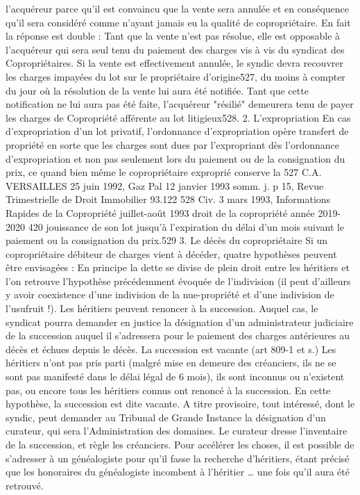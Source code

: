 l'acquéreur parce qu'il est convaincu que la vente sera annulée et en conséquence qu'il sera considéré comme n'ayant jamais eu la qualité de copropriétaire.
En fait la réponse est double :
Tant que la vente n'est pas résolue, elle est opposable à l'acquéreur qui sera seul tenu du paiement des charges vis à vis du syndicat des Copropriétaires.
Si la vente est effectivement annulée, le syndic devra recouvrer les charges impayées du lot sur le propriétaire d'origine527, du moins à compter du jour où la résolution de la vente lui aura été notifiée. Tant que cette notification ne lui aura pas été faite, l'acquéreur "résilié" demeurera tenu de payer les charges de Copropriété afférente au lot litigieux528.
2. L’expropriation
En cas d’expropriation d’un lot privatif, l’ordonnance d’expropriation opère transfert de propriété en sorte que les charges sont dues par l’expropriant dès l’ordonnance d’expropriation et non pas seulement lors du paiement ou de la consignation du prix, ce quand bien même le copropriétaire exproprié conserve la
527 C.A. VERSAILLES 25 juin 1992, Gaz Pal 12 janvier 1993 somm. j. p 15, Revue Trimestrielle de Droit Immobilier 93.122
528 Civ. 3 mars 1993, Informations Rapides de la Copropriété juillet-août 1993
droit de la copropriété année 2019-2020
420
jouissance de son lot jusqu’à l’expiration du délai d’un mois suivant le paiement ou la consignation du prix.529
3. Le décès du copropriétaire
Si un copropriétaire débiteur de charges vient à décéder, quatre hypothèses peuvent être envisagées :
En principe la dette se divise de plein droit entre les héritiers et l'on retrouve l'hypothèse précédemment évoquée de l'indivision (il peut d'ailleurs y avoir coexistence d'une indivision de la nue-propriété et d'une indivision de l'usufruit !).
Les héritiers peuvent renoncer à la succession. Auquel cas, le syndicat pourra demander en justice la désignation d'un administrateur judiciaire de la succession auquel il s'adressera pour le paiement des charges antérieures au décès et échues depuis le décès.
La succession est vacante (art 809-1 et s.)
Les héritiers n’ont pas pris parti (malgré mise en demeure des créanciers, ils ne se sont pas manifesté dans le délai légal de 6 mois), ils sont inconnus ou n’existent pas, ou encore tous les héritiers connus ont renoncé à la succession. En cette hypothèse, la succession est dite vacante.
A titre provisoire, tout intéressé, dont le syndic, peut demander au Tribunal de Grande Instance la désignation d'un curateur, qui sera l’Administration des domaines. Le curateur dresse l’inventaire de la succession, et règle les créanciers. Pour accélérer les choses, il est possible de s’adresser à un généalogiste pour qu’il fasse la recherche d’héritiers, étant précisé que les honoraires du généalogiste incombent à l’héritier … une fois qu’il aura été retrouvé.
